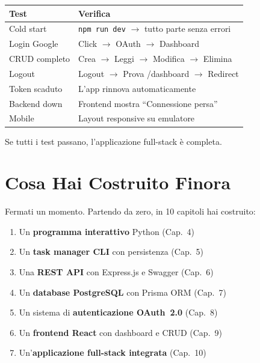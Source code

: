 \begin{center}
\begin{tabularx}{\textwidth}{l X}
\toprule
\textbf{Test} & \textbf{Verifica} \\
\midrule
Cold start & \texttt{npm run dev} $\rightarrow$ tutto parte senza errori \\
Login Google & Click $\rightarrow$ OAuth $\rightarrow$ Dashboard \\
CRUD completo & Crea $\rightarrow$ Leggi $\rightarrow$ Modifica $\rightarrow$ Elimina \\
Logout & Logout $\rightarrow$ Prova /dashboard $\rightarrow$ Redirect \\
Token scaduto & L'app rinnova automaticamente \\
Backend down & Frontend mostra ``Connessione persa'' \\
Mobile & Layout responsive su emulatore \\
\bottomrule
\end{tabularx}
\end{center}

\begin{checkpointbox}
Se tutti i test passano, l'applicazione full-stack è completa.
\end{checkpointbox}

\section*{Cosa Hai Costruito Finora}

Fermati un momento. Partendo da zero, in 10 capitoli hai costruito:

\begin{enumerate}
  \item Un \textbf{programma interattivo} Python (Cap.~4)
  \item Un \textbf{task manager CLI} con persistenza (Cap.~5)
  \item Una \textbf{REST API} con Express.js e Swagger (Cap.~6)
  \item Un \textbf{database PostgreSQL} con Prisma ORM (Cap.~7)
  \item Un sistema di \textbf{autenticazione OAuth~2.0} (Cap.~8)
  \item Un \textbf{frontend React} con dashboard e CRUD (Cap.~9)
  \item Un'\textbf{applicazione full-stack integrata} (Cap.~10)
\end{enumerate}

